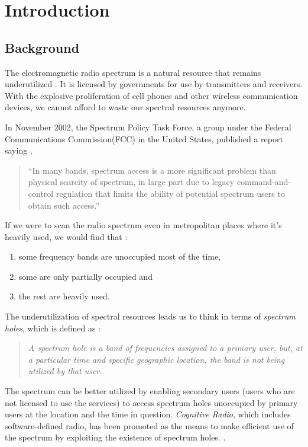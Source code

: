 \chapter{Introduction}
\section{Background}
The electromagnetic radio spectrum is a natural resource that remains underutilized \cite{haykin05}. It is licensed by governments for use by transmitters and receivers. With the explosive proliferation of cell phones and other wireless communication devices, we cannot afford to waste our spectral resources anymore.

In November 2002, the Spectrum Policy Task Force, a group under the Federal Communications Commission(FCC) in the United States, published a report saying \cite{repFCC}, 
\begin{quote}
``In many bands, spectrum access is a more significant problem than physical scarcity of spectrum, in large part due to legacy command-and-control regulation that limits the ability of potential spectrum users to obtain such access.''
\end{quote}

If we were to scan the radio spectrum even in metropolitan places where it's heavily used, we would find that \cite{staple04} :
\begin{enumerate}
	\item some frequency bands are unoccupied most of the time,
	\item some are only partially occupied and
	\item the rest are heavily used.
\end{enumerate}

The underutilization of spectral resources leads us to think in terms of \emph{spectrum holes}, which is defined as \cite{kolodzy01}:
\begin{quote}
\emph{A spectrum hole is a band of frequencies assigned to a primary user, but, at a particular time and specific geographic location, the band is not being utilized by that user.
}
\end{quote}

The spectrum can be better utilized by enabling secondary users (users who are not licensed to use the services) to access spectrum holes unoccupied by primary users at the location and the time in question. \emph{Cognitive Radio}, which includes software-defined radio, has been promoted as the means to make efficient use of the spectrum by exploiting the existence of spectrum holes. \cite{haykin05}\cite{mitola99}\cite{mitola00}.

